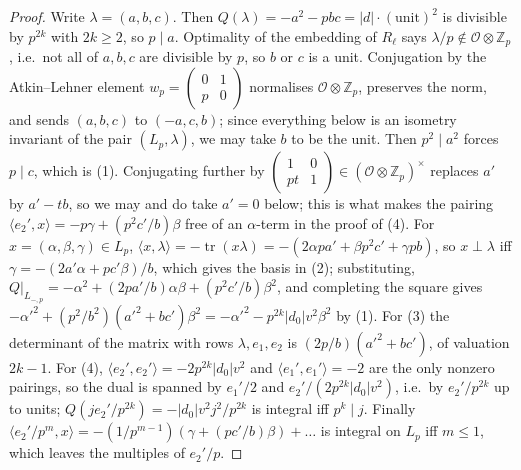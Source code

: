 \documentclass[11pt,reqno]{amsart}
\theoremstyle{plain}
\theoremstyle{definition}
\DeclareMathOperator{\tr}{tr}
\newcommand{\Z}{\mathbb{Z}}
\begin{document}
\begin{proof}
Write $\lambda=(a,b,c)$. Then $Q(\lambda)=-a^2-pbc=\lvert d\rvert\cdot(\text{unit})^2$ is divisible by
$p^{2k}$ with $2k\ge2$, so $p\mid a$. Optimality of the embedding of $R_\ell$ says $\lambda/p\notin
\mathcal O\otimes\Z_p$, i.e.\ not all of $a,b,c$ are divisible by $p$, so $b$ or $c$ is a unit.
Conjugation by the Atkin--Lehner element $w_p=\begin{pmatrix}0&1\\p&0\end{pmatrix}$ normalises
$\mathcal O\otimes\Z_p$, preserves the norm, and sends $(a,b,c)$ to $(-a,c,b)$; since everything
below is an isometry invariant of the pair $(L_p,\lambda)$, we may take $b$ to be the unit. Then
$p^2\mid a^2$ forces $p\mid c$, which is (1). Conjugating further by $\begin{pmatrix}1&0\\pt&1
\end{pmatrix}\in(\mathcal O\otimes\Z_p)^\times$ replaces $a'$ by $a'-tb$, so we may and do take
$a'=0$ below; this is what makes the pairing $\langle e_2',x\rangle=-p\gamma+(p^2c'/b)\beta$ free of an
$\alpha$-term in the proof of (4). For $x=(\alpha,\beta,\gamma)\in L_p$,
$\langle x,\lambda\rangle=-\tr(x\lambda)=-(2\alpha pa'+\beta p^2c'+\gamma pb)$, so $x\perp\lambda$
iff $\gamma=-(2a'\alpha+pc'\beta)/b$, which gives the basis in (2); substituting,
$Q|_{L_{-,p}}=-\alpha^2+(2pa'/b)\alpha\beta+(p^2c'/b)\beta^2$, and completing the square gives
$-\alpha'^2+(p^2/b^2)(a'^2+bc')\beta^2=-\alpha'^2-p^{2k}\lvert d_0\rvert v^2\beta^2$ by (1). For
(3) the determinant of the matrix with rows $\lambda,e_1,e_2$ is $(2p/b)(a'^2+bc')$, of valuation
$2k-1$. For (4), $\langle e_2',e_2'\rangle=-2p^{2k}\lvert d_0\rvert v^2$ and $\langle e_1',e_1'\rangle
=-2$ are the only nonzero pairings, so the dual is spanned by $e_1'/2$ and $e_2'/(2p^{2k}\lvert d_0
\rvert v^2)$, i.e.\ by $e_2'/p^{2k}$ up to units; $Q(je_2'/p^{2k})=-\lvert d_0\rvert v^2j^2/p^{2k}$ is
integral iff $p^k\mid j$. Finally $\langle e_2'/p^m,x\rangle=-(1/p^{m-1})(\gamma+(pc'/b)\beta)+
\dots$ is integral on $L_p$ iff $m\le1$, which leaves the multiples of $e_2'/p$.
\end{proof}
\end{document}

